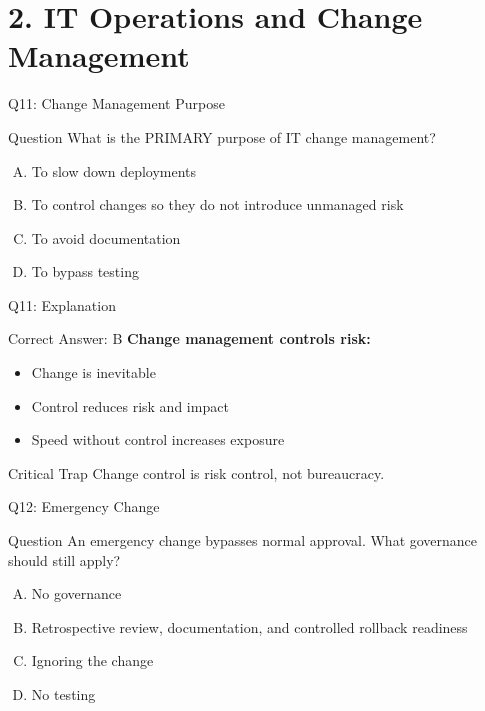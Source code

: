 \documentclass{beamer}
\begin{document}
	\section{2. IT Operations and Change Management}
	
	\begin{frame}{Q11: Change Management Purpose}
		\begin{block}{Question}
			What is the PRIMARY purpose of IT change management?
		\end{block}
		\begin{enumerate}[(A)]
			\item To slow down deployments
			\item To control changes so they do not introduce unmanaged risk
			\item To avoid documentation
			\item To bypass testing
		\end{enumerate}
	\end{frame}
	
	\begin{frame}{Q11: Explanation}
		\begin{block}{Correct Answer: B}
			\textbf{Change management controls risk:}
			\begin{itemize}
				\item Change is inevitable
				\item Control reduces risk and impact
				\item Speed without control increases exposure
			\end{itemize}
		\end{block}
		\begin{alertblock}{Critical Trap}
			Change control is risk control, not bureaucracy.
		\end{alertblock}
	\end{frame}
	
	\begin{frame}{Q12: Emergency Change}
		\begin{block}{Question}
			An emergency change bypasses normal approval. What governance should still apply?
		\end{block}
		\begin{enumerate}[(A)]
			\item No governance
			\item Retrospective review, documentation, and controlled rollback readiness
			\item Ignoring the change
			\item No testing
		\end{enumerate}
	\end{frame}
	
\end{document}
